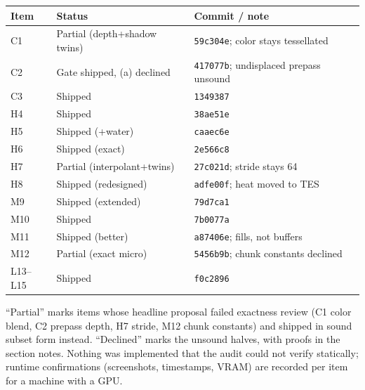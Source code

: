 \documentclass[11pt,a4paper]{article}
\begin{document}
\begin{table}[h]
\centering
\small
\begin{tabular}{@{}lll@{}}
\toprule
\textbf{Item} & \textbf{Status} & \textbf{Commit / note} \\
\midrule
C1 & Partial (depth+shadow twins) & \texttt{59c304e}; color stays tessellated \\
C2 & Gate shipped, (a) declined & \texttt{417077b}; undisplaced prepass unsound \\
C3 & Shipped & \texttt{1349387} \\
H4 & Shipped & \texttt{38ae51e} \\
H5 & Shipped (+water) & \texttt{caaec6e} \\
H6 & Shipped (exact) & \texttt{2e566c8} \\
H7 & Partial (interpolant+twins) & \texttt{27c021d}; stride stays 64 \\
H8 & Shipped (redesigned) & \texttt{adfe00f}; heat moved to TES \\
M9 & Shipped (extended) & \texttt{79d7ca1} \\
M10 & Shipped & \texttt{7b0077a} \\
M11 & Shipped (better) & \texttt{a87406e}; fills, not buffers \\
M12 & Partial (exact micro) & \texttt{5456b9b}; chunk constants declined \\
L13--L15 & Shipped & \texttt{f0c2896} \\
\bottomrule
\end{tabular}
\end{table}

``Partial'' marks items whose headline proposal failed exactness review
(C1 color blend, C2 prepass depth, H7 stride, M12 chunk constants) and
shipped in sound subset form instead. ``Declined'' marks the unsound halves,
with proofs in the section notes. Nothing was implemented that the audit
could not verify statically; runtime confirmations (screenshots, timestamps,
VRAM) are recorded per item for a machine with a GPU.
\end{document}
